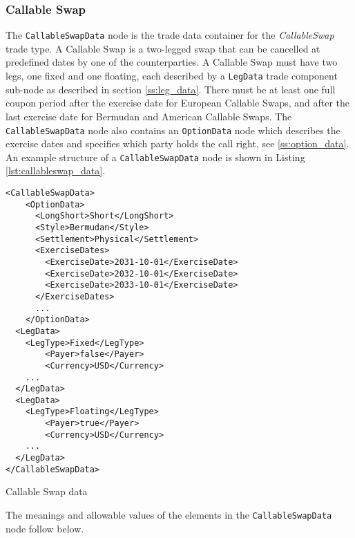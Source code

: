 \subsubsection{Callable Swap}\label{ss:callable_swap}

The \lstinline!CallableSwapData! node is the trade data container for the \emph{CallableSwap} trade type. A Callable Swap is a
two-legged swap that can be cancelled at predefined dates by one of the counterparties. A Callable Swap must have two legs,
one fixed and one floating, each described by a \lstinline!LegData! trade component sub-node as described in section
\ref{ss:leg_data}.  There must be at least one full coupon period after the exercise date for European 
Callable Swaps, and after the last exercise date for Bermudan and American Callable Swaps. The \lstinline!CallableSwapData! node also contains an \lstinline!OptionData! node which describes
the exercise dates and specifies which party holds the call right, see \ref{ss:option_data}. An example structure of a
\lstinline!CallableSwapData! node is shown in Listing \ref{lst:callableswap_data}.

\begin{listing}[H]
\begin{verbatim}
<CallableSwapData>
    <OptionData>
      <LongShort>Short</LongShort>
      <Style>Bermudan</Style>
      <Settlement>Physical</Settlement>
      <ExerciseDates>
        <ExerciseDate>2031-10-01</ExerciseDate>
        <ExerciseDate>2032-10-01</ExerciseDate>
        <ExerciseDate>2033-10-01</ExerciseDate>
      </ExerciseDates>
      ...
    </OptionData>
  <LegData>
	<LegType>Fixed</LegType>
        <Payer>false</Payer>    
        <Currency>USD</Currency>	
	...
  </LegData>
  <LegData>
	<LegType>Floating</LegType>
        <Payer>true</Payer>     
        <Currency>USD</Currency>	
	...
  </LegData>
</CallableSwapData>
\end{verbatim}
\caption{Callable Swap data}
\label{lst:callableswap_data}
\end{listing}



The meanings and allowable values of the elements in the \lstinline!CallableSwapData!  node follow below.


